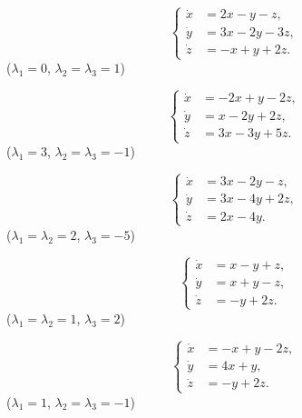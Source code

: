 \begin{multicols}{2}
    \begin{problem}
        \[ \left\{ \begin{aligned} 
            \dot x &= 2 x - y - z, \\
            \dot y &= 3 x - 2 y - 3 z, \\
            \dot z &= -x + y + 2 z.
        \end{aligned} \right. \]
        ($\lambda_1 = 0$, $\lambda_2 = \lambda_3 = 1$)
    \end{problem}
    
    \begin{problem}
        \[ \left\{ \begin{aligned} 
            \dot x &= - 2 x + y - 2 z, \\
            \dot y &= x - 2 y + 2 z, \\
            \dot z &= 3 x - 3 y + 5 z.
        \end{aligned} \right. \]
        ($\lambda_1 = 3$, $\lambda_2 = \lambda_3 = -1$)
    \end{problem}
    
    \begin{problem}
        \[ \left\{ \begin{aligned} 
            \dot x &= 3 x - 2 y - z, \\
            \dot y &= 3 x - 4 y + 2 z, \\
            \dot z &= 2 x - 4 y.
        \end{aligned} \right. \]
        ($\lambda_1 = \lambda_2 = 2$, $\lambda_3 = -5$)
    \end{problem}
    
    \begin{problem}
        \[ \left\{ \begin{aligned} 
            \dot x &= x - y + z, \\
            \dot y &= x + y - z, \\
            \dot z &= - y + 2 z.
        \end{aligned} \right. \]
        ($\lambda_1 = \lambda_2 = 1$, $\lambda_3 = 2$)
    \end{problem}

    \begin{problem}
        \[ \left\{ \begin{aligned} 
            \dot x &= - x + y - 2 z, \\
            \dot y &= 4 x + y, \\
            \dot z &= - y + 2 z.
        \end{aligned} \right. \]
        ($\lambda_1 = 1$, $\lambda_2 = \lambda_3 = -1$)
    \end{problem}
\end{multicols}
    
